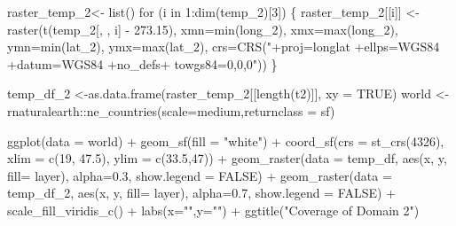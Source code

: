 \documentclass[
  letterpaper,
  DIV=11,
  numbers=noendperiod,
  abstract]{scrartcl}
\newenvironment{Shaded}{\begin{snugshade}}{\end{snugshade}}
\newcommand{\AttributeTok}[1]{\textcolor[rgb]{0.40,0.45,0.13}{#1}}
\newcommand{\ConstantTok}[1]{\textcolor[rgb]{0.56,0.35,0.01}{#1}}
\newcommand{\ControlFlowTok}[1]{\textcolor[rgb]{0.00,0.23,0.31}{#1}}
\newcommand{\DecValTok}[1]{\textcolor[rgb]{0.68,0.00,0.00}{#1}}
\newcommand{\FloatTok}[1]{\textcolor[rgb]{0.68,0.00,0.00}{#1}}
\newcommand{\FunctionTok}[1]{\textcolor[rgb]{0.28,0.35,0.67}{#1}}
\newcommand{\NormalTok}[1]{\textcolor[rgb]{0.00,0.23,0.31}{#1}}
\newcommand{\OtherTok}[1]{\textcolor[rgb]{0.00,0.23,0.31}{#1}}
\newcommand{\SpecialCharTok}[1]{\textcolor[rgb]{0.37,0.37,0.37}{#1}}
\newcommand{\StringTok}[1]{\textcolor[rgb]{0.13,0.47,0.30}{#1}}
\begin{document}
\begin{Shaded}
\begin{Highlighting}[]
\NormalTok{raster\_temp\_2}\OtherTok{\textless{}{-}} \FunctionTok{list}\NormalTok{()}
\ControlFlowTok{for}\NormalTok{ (i }\ControlFlowTok{in} \DecValTok{1}\SpecialCharTok{:}\FunctionTok{dim}\NormalTok{(temp\_2)[}\DecValTok{3}\NormalTok{])   \{}
\NormalTok{  raster\_temp\_2[[i]] }\OtherTok{\textless{}{-}} \FunctionTok{raster}\NormalTok{(}\FunctionTok{t}\NormalTok{(temp\_2[, , i] }\SpecialCharTok{{-}} \FloatTok{273.15}\NormalTok{), }
     \AttributeTok{xmn=}\FunctionTok{min}\NormalTok{(long\_2), }\AttributeTok{xmx=}\FunctionTok{max}\NormalTok{(long\_2),}
     \AttributeTok{ymn=}\FunctionTok{min}\NormalTok{(lat\_2), }\AttributeTok{ymx=}\FunctionTok{max}\NormalTok{(lat\_2), }
     \AttributeTok{crs=}\FunctionTok{CRS}\NormalTok{(}\StringTok{"+proj=longlat +ellps=WGS84 +datum=WGS84 +no\_defs+ towgs84=0,0,0"}\NormalTok{))}
\NormalTok{                              \}}

\NormalTok{temp\_df\_2 }\OtherTok{\textless{}{-}}\FunctionTok{as.data.frame}\NormalTok{(raster\_temp\_2[[}\FunctionTok{length}\NormalTok{(t2)]], }\AttributeTok{xy =} \ConstantTok{TRUE}\NormalTok{) }
\NormalTok{world }\OtherTok{\textless{}{-}}\NormalTok{ rnaturalearth}\SpecialCharTok{::}\FunctionTok{ne\_countries}\NormalTok{(}\AttributeTok{scale=}\StringTok{\textquotesingle{}medium\textquotesingle{}}\NormalTok{,}\AttributeTok{returnclass =} \StringTok{\textquotesingle{}sf\textquotesingle{}}\NormalTok{)}

\FunctionTok{ggplot}\NormalTok{(}\AttributeTok{data =}\NormalTok{ world)  }\SpecialCharTok{+} \FunctionTok{geom\_sf}\NormalTok{(}\AttributeTok{fill =} \StringTok{"white"}\NormalTok{) }\SpecialCharTok{+} 
  \FunctionTok{coord\_sf}\NormalTok{(}\AttributeTok{crs =} \FunctionTok{st\_crs}\NormalTok{(}\DecValTok{4326}\NormalTok{), }\AttributeTok{xlim =} \FunctionTok{c}\NormalTok{(}\DecValTok{19}\NormalTok{, }\FloatTok{47.5}\NormalTok{), }\AttributeTok{ylim =} \FunctionTok{c}\NormalTok{(}\FloatTok{33.5}\NormalTok{,}\DecValTok{47}\NormalTok{)) }\SpecialCharTok{+}
  \FunctionTok{geom\_raster}\NormalTok{(}\AttributeTok{data =}\NormalTok{ temp\_df, }
            \FunctionTok{aes}\NormalTok{(x, y, }\AttributeTok{fill=}\NormalTok{ layer), }\AttributeTok{alpha=}\FloatTok{0.3}\NormalTok{, }\AttributeTok{show.legend =} \ConstantTok{FALSE}\NormalTok{) }\SpecialCharTok{+} 
  \FunctionTok{geom\_raster}\NormalTok{(}\AttributeTok{data =}\NormalTok{ temp\_df\_2, }
            \FunctionTok{aes}\NormalTok{(x, y, }\AttributeTok{fill=}\NormalTok{ layer), }\AttributeTok{alpha=}\FloatTok{0.7}\NormalTok{, }\AttributeTok{show.legend =} \ConstantTok{FALSE}\NormalTok{) }\SpecialCharTok{+} 
  \FunctionTok{scale\_fill\_viridis\_c}\NormalTok{() }\SpecialCharTok{+} \FunctionTok{labs}\NormalTok{(}\AttributeTok{x=}\StringTok{""}\NormalTok{,}\AttributeTok{y=}\StringTok{""}\NormalTok{) }\SpecialCharTok{+} 
  \FunctionTok{ggtitle}\NormalTok{(}\StringTok{"Coverage of Domain 2"}\NormalTok{) }
\end{Highlighting}
\end{Shaded}
\end{document}
